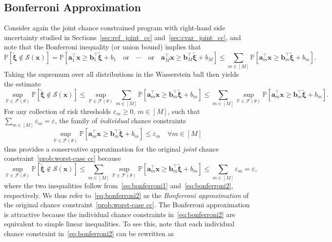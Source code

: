 \documentclass[nonblindrev]{informs2017}
\newcommand{\bmt}[1]{\tilde{\bm{#1}}}
\newcommand{\1}[1]{\mathds{1}{\left(#1\right)}}
\begin{document}
\subsection{Bonferroni Approximation}
\label{sec:bonferroni}
Consider again the joint chance constrained program with right-hand side uncertainty studied in Sections~\ref{sec:ref_joint_cc} and~\ref{sec:cvar_joint_cc}, and note that the Bonferroni inequality (or union bound) implies that
$$
\mathbb{P}[\bmt{\xi} \notin \mathcal{S}(\bm{x})] = \mathbb{P}[\bm{a}^\top_1 \bm{x} \ge \bm{b}^\top_1 \bmt{\xi} + b_1 \quad \text{or}\quad \cdots \quad \text{or} \quad \bm{a}^\top_M \bm{x} \ge \bm{b}^\top_M \bmt{\xi} + b_M] \leq \sum_{m \in [M]}\mathbb{P}[\bm{a}^\top_m \bm{x} \ge \bm{b}^\top_m \bmt{\xi} + b_m].
$$
Taking the supremum over all distributions in the Wasserstein ball then yields the estimate
\begin{equation}
\label{eq:bonferroni1}
\sup_{\mathbb P\in\mathcal F(\theta)} \mathbb{P}[\bmt{\xi} \notin \mathcal{S}(\bm{x})] \leq \sup_{\mathbb P\in\mathcal F(\theta)} \sum_{m \in [M]}\mathbb{P}[\bm{a}^\top_m \bm{x} \ge \bm{b}^\top_m \bmt{\xi} + b_m] \leq \sum_{m \in [M]} \sup_{\mathbb P\in\mathcal F(\theta)} \mathbb{P}[\bm{a}^\top_m \bm{x} \ge \bm{b}^\top_m\bmt{\xi} + b_m].
\end{equation}
For any collection of risk thresholds $\varepsilon_m \geq 0$, $m \in [M]$, such that $\sum_{m \in [M]} \varepsilon_m = \varepsilon$, the family of {\em individual} chance constraints
\begin{equation}
\label{eq:bonferroni2}
\sup_{\mathbb{P} \in \mathcal{F}(\theta)} \mathbb{P}[\bm{a}^\top_m \bm{x} \ge \bm{b}^\top_m \bmt{\xi} + b_m] \leq \varepsilon_m \quad\forall m \in [M]
\end{equation}
thus provides a conservative approximation for the original {\em joint} chance constraint~\eqref{prob:worst-case cc} because
$$
\sup_{\mathbb P\in\mathcal F(\theta)} \mathbb{P}[\bmt{\xi} \notin \mathcal{S}(\bm{x})] \leq \sum_{m \in [M]} \sup_{\mathbb P\in\mathcal F(\theta)} \mathbb{P}[\bm{a}^\top_m \bm{x} \ge \bm{b}^\top_m \bmt{\xi} + b_m]\leq \sum_{m \in [M]} \varepsilon_m = \varepsilon,
$$
where the two inequalities follow from~\eqref{eq:bonferroni1} and~\eqref{eq:bonferroni2}, respectively. We thus refer to~\eqref{eq:bonferroni2} as the {\em Bonferroni approximation} of the original chance constraint~\eqref{prob:worst-case cc}. The Bonferroni approximation is attractive because the individual chance constraints in~\eqref{eq:bonferroni2} are equivalent to simple linear inequalities. To see this, note that each individual chance constraint in~\eqref{eq:bonferroni2} can be rewritten as
\end{document}
